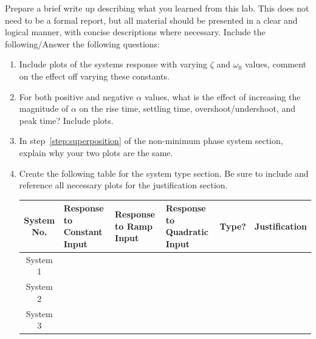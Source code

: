 Prepare a brief write up describing what you learned from this lab. This does not
need to be a formal report, but all material should be presented in a clear and logical manner,
with concise descriptions where necessary. Include the following/Answer the following questions:
\begin{enumerate}
    \item Include plots of the systems response with varying \(\zeta \) and \(\omega_0 \) values, comment
          on the effect off varying these constants.
    \item For both positive and negative \(\alpha \) values, what is the effect of increasing the magnitude
          of \(\alpha \) on the rise time, settling time, overshoot/undershoot, and peak time? Include plots.
    \item In step~\ref{step:superposition} of the non-minimum phase system section, explain why your two
          plots are the same.
    \item Create the following table for the system type section. Be sure to include and reference all
          necessary plots for the justification section.
          \begin{table}[htbp]\label{tab:systype}
              \centering
              \begin{tabularx}{.9\linewidth}{|c|X|X|X|c|c|}\hline %
                  System No. & \raggedright{Response to Constant Input} & \raggedright{Response to Ramp Input} & \raggedright{Response to Quadratic Input} &
                  Type?      & Justification                                                                                                                     \\\hline %
                  System 1   &                                          &                                      &                                           &   & \\\hline %
                  System 2   &                                          &                                      &                                           &   & \\\hline %
                  System 3   &                                          &                                      &                                           &   & \\
                  \hline %
              \end{tabularx}
          \end{table}
\end{enumerate}

